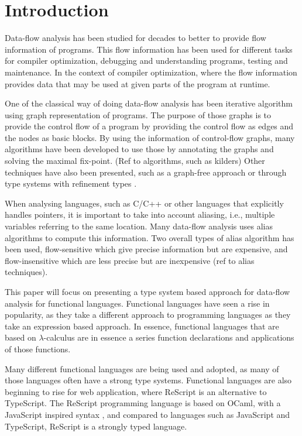 \documentclass[../../master.tex]{subfiles}
\begin{document}
\section{Introduction}
Data-flow analysis has been studied for decades to better to provide flow information of programs.
This flow information has been used for different tasks for compiler optimization, debugging and understanding programs, testing and maintenance.
In the context of compiler optimization, where the flow information provides data that may be used at given parts of the program at runtime.

One of the classical way of doing data-flow analysis has been iterative algorithm using graph representation of programs.
The purpose of those graphs is to provide the control flow of a program by providing the control flow as edges and the nodes as basic blocks.
By using the information of control-flow graphs, many algorithms have been developed to use those by annotating the graphs and solving the maximal fix-point\cite{KildallGaryA1973Auat}. (Ref to algorithms, such as kilders)
Other techniques have also been presented, such as a graph-free approach \cite{HorspoolR.Niegel2002AGAt} or through type systems with refinement types \cite{PavlinovicZvonimir2021Dfrt}.

When analysing languages, such as C/C++ or other languages that explicitly handles pointers, it is important to take into account aliasing, i.e., multiple variables referring to the same location.
Many data-flow analysis uses alias algorithms to compute this information.
Two overall types of alias algorithm has been used, flow-sensitive which give precise information but are expensive, and flow-insensitive which are less precise but are inexpensive \cite{LiangDonglin1999Eaag}(ref to alias techniques).
\bigskip

This paper will focus on presenting a type system based approach for data-flow analysis for functional languages.
Functional languages have seen a rise in popularity, as they take a different approach to programming languages as they take an expression based approach.
In essence, functional languages that are based on $\lambda$-calculus are in essence a series function declarations and applications of those functions.

Many different functional languages are being used and adopted, as many of those languages often have a strong type systems.
Functional languages are also beginning to rise for web application, where ReScript is an alternative to TypeScript.
The ReScript programming language is based on OCaml, with a JavaScript inspired syntax \cite{rescript_rebrand}, and compared to languages such as JavaScript and TypeScript, ReScript is a strongly typed language.
\end{document}
